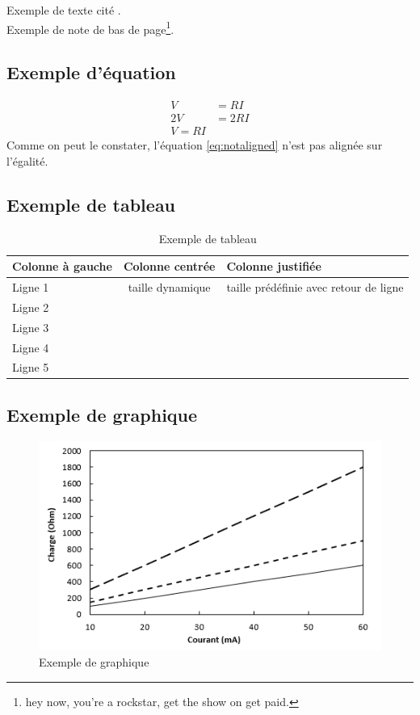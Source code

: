 Exemple de texte cité \cite{Hambley}.\\
Exemple de note de bas de page\footnote[1]{hey now, you're a rockstar, get the show on get paid.}.

\subsection{Exemple d'équation}
  \begin{align}
    V &= RI \\
    2V &= 2RI \\
    V = RI \label{eq:notaligned}
  \end{align}
Comme on peut le constater, l'équation \ref{eq:notaligned} n'est pas alignée sur l'égalité.

\subsection{Exemple de tableau}
  \begin{table}[H]
    \begin{center}
      \caption{Exemple de tableau}
      \begin{tabular}{l | c p{3cm}} 
        \hline
        \textbf{Colonne à gauche} & \textbf{Colonne centrée} & \textbf{Colonne justifiée} \\ [0.75ex] 
        \hline\hline
        Ligne 1 & taille dynamique & taille prédéfinie avec retour de ligne\\
        Ligne 2 & & \\
        Ligne 3 & & \\
        Ligne 4 & & \\
        Ligne 5 & & \\ [1ex]
        \hline
      \end{tabular}
    \end{center}
  \end{table}

\subsection{Exemple de graphique}
  \begin{figure}[H]
    \centering
    \includegraphics[scale=1]{Images/Graph.png}
    \caption{Exemple de graphique}
    \label{fig:Graph}
  \end{figure}

